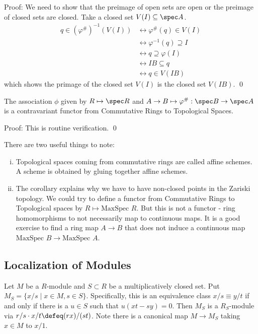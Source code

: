 \noindent Proof: We need to show that the preimage of open sets are open or the preimage of closed sets are closed. Take a closed set $V(I) \subseteq \spec A$.
\[
\begin{split}
q \in (\varphi^{\#})^{-1}(V(I)) &\leftrightarrow \varphi^{\#}(q) \in V(I) \\
&\leftrightarrow \varphi^{-1}(q) \supseteq I \\
&\leftrightarrow q \supseteq \varphi(I) \\
&\leftrightarrow IB \subseteq q \\
&\leftrightarrow q \in V(IB)
\end{split}
\]
which shows the primage of the closed set $V(I)$ is the closed set $V(IB)$. \qed \\

\begin{cor}
The association $\phi$ given by $R \mapsto \spec R$ and $A \to B \mapsto \varphi^{\#}: \spec B \to \spec A$ is a contravariant functor from Commutative Rings to Topological Spaces. 
\end{cor}

\noindent Proof: This is routine verification. \qed \\

\begin{rem} There are two useful things to note: \\
\begin{enumerate}[(i)]
\item Topological spaces coming from commutative rings are called affine schemes. A scheme is obtained by gluing together affine schemes. 

\item The corollary explains why we have to have non-closed points in the Zariski topology. We could try to define a functor from Commutative Rings to Topological spaces by $R \mapsto \text{MaxSpec }R$. But this is not a functor - ring homomorphisms to not necessarily map to continuous maps. It is a good exercise to find a ring map $A \to B$ that does not induce a continuous map $\text{MaxSpec }B \to \text{MaxSpec }A$. 
\end{enumerate}
\end{rem}

\subsection{Localization of Modules}

\begin{dfn}
Let $M$ be a $R$-module and $S \subset R$ be a multiplicatively closed set. Put $M_S=\{x/s\;|\; x \in M, s \in S\}$. Specifically, this is an equivalence class $x/s \equiv y/t$ if and only if there is a $u \in S$ such that $u(xt-sy)=0$. Then $M_S$ is a $R_S$-module via $r/s \cdot x/t \defeq (rx)/(st)$. Note there is a canonical map $M \to M_S$ taking $x \in M$ to $x/1$.
\end{dfn}

